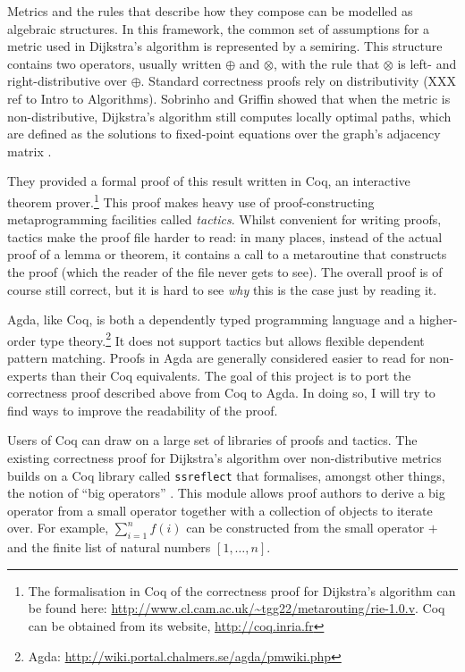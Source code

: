 \documentclass[a4paper]{scrartcl}
\begin{document}
Metrics and the rules that describe how they compose can be modelled as algebraic structures. In this framework, the common set of assumptions for a metric used in Dijkstra's algorithm is represented by a semiring. This structure contains two operators, usually written \(\oplus\) and \(\otimes\), with the rule that \(\otimes\) is left- and right-distributive over \(\oplus\). Standard correctness proofs rely on distributivity (XXX ref to Intro to Algorithms). Sobrinho and Griffin showed that when the metric is non-distributive, Dijkstra's algorithm still computes locally optimal paths, which are defined as the solutions to fixed-point equations over the graph's adjacency matrix \autocite{sobrinho_routing_2010}.

They provided a formal proof of this result written in Coq, an interactive theorem prover.\footnote{The formalisation in Coq of the correctness proof for Dijkstra's algorithm can be found here: \url{http://www.cl.cam.ac.uk/~tgg22/metarouting/rie-1.0.v}. Coq can be obtained from its website, \url{http://coq.inria.fr}} This proof makes heavy use of proof-constructing metaprogramming facilities called \emph{tactics}. Whilst convenient for writing proofs, tactics make the proof file harder to read: in many places, instead of the actual proof of a lemma or theorem, it contains a call to a metaroutine that constructs the proof (which the reader of the file never gets to see). The overall proof is of course still correct, but it is hard to see \emph{why} this is the case just by reading it.

Agda, like Coq, is both a dependently typed programming language and a higher-order type theory.\footnote{Agda: \url{http://wiki.portal.chalmers.se/agda/pmwiki.php}} 
It does not support tactics but allows flexible dependent pattern matching. Proofs in Agda are generally considered easier to read for non-experts than their Coq equivalents. The goal of this project is to port the correctness proof described above from Coq to Agda. In doing so, I will try to find ways to improve the readability of the proof.

Users of Coq can draw on a large set of libraries of proofs and tactics. The existing correctness proof for Dijkstra's algorithm over non-distributive metrics builds on a Coq library called \texttt{ssreflect} that formalises, amongst other things, the notion of \enquote{big operators} \autocite{bertot_canonical_2008}. This module allows proof authors to derive a big operator from a small operator together with a collection of objects to iterate over. For example, \(\sum_{i=1}^n f(i)\) can be constructed from the small operator \(+\) and the finite list of natural numbers \([1, \dots, n]\).
\end{document}
